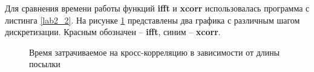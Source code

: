 \documentclass[a4paper,14pt]{extarticle}
\begin{document}
Для сравнения времени работы функций \textbf{ifft} и \textbf{xcorr} использовалась программа с листинга \ref{lab2_2}. На рисунке \ref{015}  представлены два графика с различным шагом дискретизации. Красным обозначен -- \textbf{ifft}, синим -- \textbf{xcorr}.

\begin{figure}[H]
\begin{minipage}[h]{0.49\linewidth}
\end{minipage}
\hfill
\begin{minipage}[h]{0.49\linewidth}
\end{minipage}
\caption{Время затрачиваемое на кросс-корреляцию в зависимости от длины посылки}
\label{015}
\end{figure}
\end{document}

